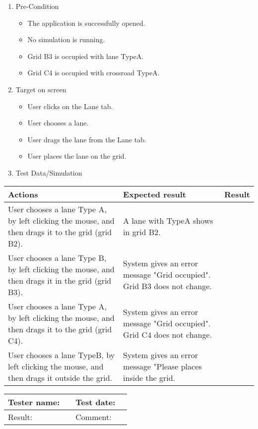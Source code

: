 \begin{enumerate}
	\item Pre-Condition
	\begin{itemize}
		\item The application is successfully opened.
		\item No simulation is running.
		\item Grid B3 is occupied with lane TypeA.
		\item Grid C4 is occupied with crossroad TypeA.
	\end{itemize}
	\item Target on screen
	\begin{itemize}
		\item User clicks on the Lane tab.
		\item User chooses a lane.
		\item User drags the lane from the Lane tab.
		\item User places the lane on the grid.
	\end{itemize}
	\item Test Data/Simulation
\end{enumerate}	
	\begin{tabularx}{\textwidth}{|X|X|p{2.5cm}|}\hline
		Actions & Expected result & Result \\\hline
		User chooses a lane Type A, by left clicking the mouse, and then drags it to the grid (grid B2). & A lane with TypeA shows in grid B2. & \pass \\\hline
		User chooses a lane Type B, by left clicking the mouse, and then drags it in the grid (grid B3). & System gives an  error message "Grid occupied". Grid B3 does not change. & \pass\\\hline
		User chooses a lane Type A, by left clicking the mouse, and then drags it to the grid (grid C4). & System gives an  error message "Grid occupied". Grid C4 does not change. & \pass\\\hline
		User chooses a lane TypeB, by left clicking the mouse, and then drags it outside the grid. & System gives an error message "Please places inside the grid. & \pass\\\hline
	\end{tabularx}


\begin{tabularx}{\textwidth}{|p{3cm}X|p{3cm}X|}\hline
	Tester name: &  & Test date: & \\\hline
	Result: &  \pass  & Comment: & \\\hline
\end{tabularx}

